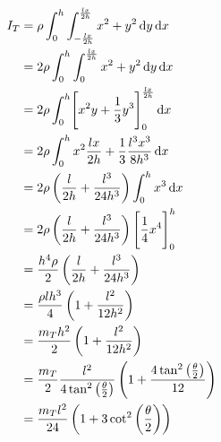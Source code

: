 \begin{equation}
	\label{eq:subtriangle_moment_long}
	\begin{split}
		I_{T} &= \rho \int_0^h\int_{-\frac{lx}{2h}}^{\frac{lx}{2h}}x^2 + y^2 \mathop{}\!\mathrm{d} y\mathop{}\!\mathrm{d} x\\
		&= 2\rho \int_0^h\int_0^{\frac{lx}{2h}} x^2 + y^2 \mathop{}\!\mathrm{d} y\mathop{}\!\mathrm{d} x\\
		&= 2\rho \int_0^h \Biggl[x^2y + \frac{1}{3} y^3\Biggr]_0^{\frac{lx}{2h}} \mathop{}\!\mathrm{d} x\\
		&= 2\rho \int_0^h x^2 \frac{lx}{2h} + \frac{1}{3} \frac{l^3x^3}{8h^3} \mathop{}\!\mathrm{d} x\\
		&= 2\rho \left(\frac{l}{2h} + \frac{l^3}{24h^3}\right) \int_0^h x^3 \mathop{}\!\mathrm{d} x\\
		&= 2\rho \left(\frac{l}{2h} + \frac{l^3}{24h^3}\right)  \Biggl[ \frac{1}{4} x^4\Biggr]_0^h \\
		&= \frac{h^4\rho}{2} \left(\frac{l}{2h} + \frac{l^3}{24h^3}\right) \\
		&= \frac{\rho lh^3}{4} \left(1 + \frac{l^2}{12h^2}\right) \\
		&= \frac{m_T h^2}{2} \left(1 + \frac{l^2}{12h^2}\right) \\
		&= \frac{m_T}{2} \frac{l^2}{4 \tan^2\left(\frac{\theta}{2}\right)}\left(1 + \frac{4 \tan^2\left(\frac{\theta}{2}\right)}{12}\right) \\
		&= \frac{m_Tl^2}{24} \left(1 + 3\cot^2\left(\frac{\theta}{2}\right)\right)
	\end{split}
\end{equation}
